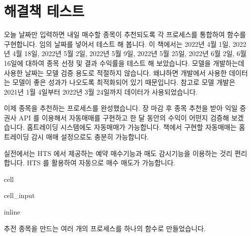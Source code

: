 \documentclass[letterpaper,10pt,english]{jupyterBook}
\begin{document}
\sphinxAtStartPar

\sphinxAtStartPar
{}

\sphinxAtStartPar
{}

\sphinxAtStartPar
{}

\sphinxAtStartPar
{}


\section{해결책 테스트}
\label{\detokenize{chapter6/6.1.2_Stock_Selection_Function:id1}}\label{\detokenize{chapter6/6.1.2_Stock_Selection_Function::doc}}
\sphinxAtStartPar
오늘 날짜만 입력하면 내일 매수할 종목이 추천되도록 각 프로세스를 통합하여 함수를 구현합니다. 임의 날짜를 넣어서 테스트 해 봅니다. 이 책에서는 2022년 4월 1일, 2022년 4월 18일,  2022년 5월 2일, 2022년 5월 9일, 2022년 5월 25일,  2022년 6월 2일, 6월 16일에 대하여 종목 선정 및 결과 수익률을 테스트 해 보았습니다.  모델을 개발하는데 사용한 날짜는 모델 검증 용도로 적절하지 않습니다. 왜냐하면 개발에서 사용한 데이터는 모델이 좋은 성과가 나오도록 최적화되어 있기 때문입니다.  참고로 모델 개발은 2021년 1월 4일부터 2022년 3월 24일까지 데이터가 사용되었습니다.

\sphinxAtStartPar
이제 종목을 추천하는 프로세스를 완성했습니다. 장 마감 후 종목 추천을 받아 익일 증권사 API  를 이용해서 자동매매를 구현하고 한 달 동안의 수익이 어떤지 검증해 보겠습니다. 홈트레이딩 시스템에도 자동매매가 가능합니다. 책에서 구현할 자동매매는 홈트레이딩 감시 매매 설정으로도 충분히 가능합니다.

\sphinxAtStartPar
실전에서는 HTS 에서 제공하는 예약 매수기능과 매도 감시기능을 이용하는 것리 편리합니다. HTS 를 활용하여 자동으로 매수 매도가 가능합니다.

\begin{sphinxuseclass}{cell}\begin{sphinxVerbatimInput}

\begin{sphinxuseclass}{cell_input}
\begin{sphinxVerbatim}[commandchars=\\\{\}]
   
   
 inline
   
   
 
 
 
\end{sphinxVerbatim}

\end{sphinxuseclass}\end{sphinxVerbatimInput}

\end{sphinxuseclass}
\sphinxAtStartPar
 추전 종목을 만드는 여러 개의 프로세스를 하나의 함수로 만들었습니다.
\end{document}
